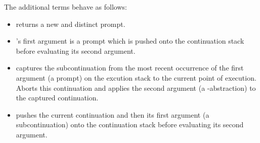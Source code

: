 The additional terms behave as follows:
\begin{itemize}
\item {} returns a new and distinct prompt.
\item {}'s first argument is a prompt which is pushed onto the continuation stack before evaluating its second argument. 
\item {} captures the subcontinuation from the most recent occurrence of the first argument (a prompt) on the excution stack to the current point of execution. Aborts this continuation and applies the second argument (a \lam-abstraction) to the captured continuation.
\item {} pushes the current continuation and then its first argument (a subcontinuation) onto the continuation stack before evaluating its second argument.
\end{itemize}
